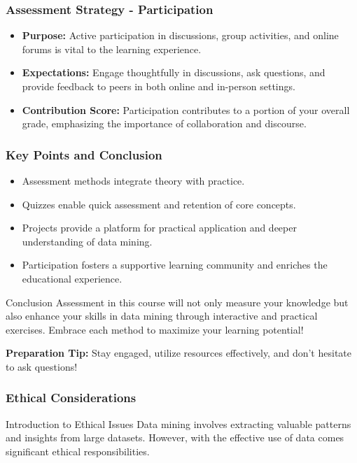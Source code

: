 \documentclass[aspectratio=169]{beamer}
\begin{document}
\begin{frame}[fragile]
  \frametitle{Assessment Strategy - Participation}
  \begin{itemize}
    \item \textbf{Purpose:} Active participation in discussions, group activities, and online forums is vital to the learning experience. 
    \item \textbf{Expectations:} Engage thoughtfully in discussions, ask questions, and provide feedback to peers in both online and in-person settings.
    \item \textbf{Contribution Score:} Participation contributes to a portion of your overall grade, emphasizing the importance of collaboration and discourse.
  \end{itemize}
\end{frame}

\begin{frame}[fragile]
  \frametitle{Key Points and Conclusion}
  \begin{itemize}
    \item Assessment methods integrate theory with practice.
    \item Quizzes enable quick assessment and retention of core concepts.
    \item Projects provide a platform for practical application and deeper understanding of data mining.
    \item Participation fosters a supportive learning community and enriches the educational experience.
  \end{itemize}
  
  \begin{block}{Conclusion}
    Assessment in this course will not only measure your knowledge but also enhance your skills in data mining through interactive and practical exercises. Embrace each method to maximize your learning potential!
  \end{block}
  
  \textbf{Preparation Tip:} Stay engaged, utilize resources effectively, and don’t hesitate to ask questions!
\end{frame}

\begin{frame}[fragile]
  \frametitle{Ethical Considerations}
  \begin{block}{Introduction to Ethical Issues}
    Data mining involves extracting valuable patterns and insights from large datasets. However, with the effective use of data comes significant ethical responsibilities.
  \end{block}
\end{frame}
\end{document}
